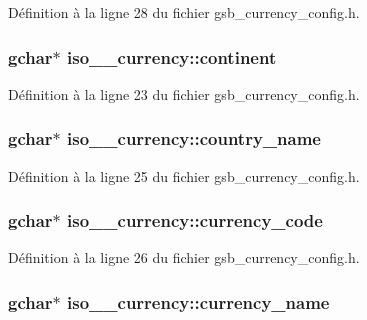 Définition à la ligne 28 du fichier gsb\_\-currency\_\-config.h.

\subsubsection[{continent}]{\setlength{\rightskip}{0pt plus 5cm}gchar$\ast$ {\bf iso\_\_\-currency::continent}}\label{structiso__4217__currency_a72367f0d6562490cdfe494fcfa7c073a}


Définition à la ligne 23 du fichier gsb\_\-currency\_\-config.h.

\subsubsection[{country\_\-name}]{\setlength{\rightskip}{0pt plus 5cm}gchar$\ast$ {\bf iso\_\_\-currency::country\_\-name}}\label{structiso__4217__currency_a1eb651f1eecbde30b221d0c1cd4739bc}


Définition à la ligne 25 du fichier gsb\_\-currency\_\-config.h.

\subsubsection[{currency\_\-code}]{\setlength{\rightskip}{0pt plus 5cm}gchar$\ast$ {\bf iso\_\_\-currency::currency\_\-code}}\label{structiso__4217__currency_a2e2fe3e5f932303c2fc601c607225f40}


Définition à la ligne 26 du fichier gsb\_\-currency\_\-config.h.

\subsubsection[{currency\_\-name}]{\setlength{\rightskip}{0pt plus 5cm}gchar$\ast$ {\bf iso\_\_\-currency::currency\_\-name}}\label{structiso__4217__currency_a7ac1fb27ee7f3556d4d5a8b7e9e5c35d}


